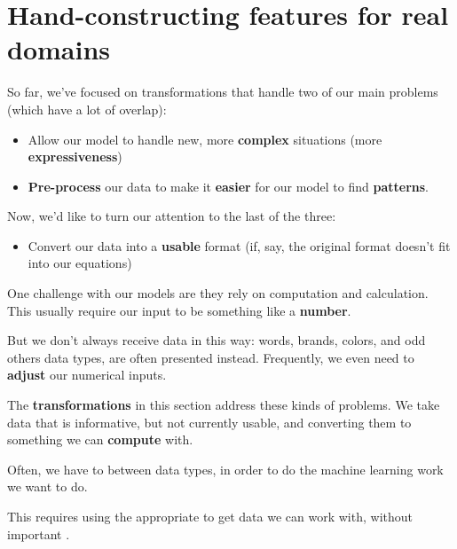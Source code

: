             
    \secdiv
    


            
    \pagebreak
    \section{Hand-constructing features for real domains }

        So far, we've focused on transformations that handle two of our main problems (which have a lot of overlap):

        \begin{itemize}
                \item Allow our model to handle new, more \textbf{complex} situations (more \textbf{expressiveness})

                \item \textbf{Pre-process} our data to make it \textbf{easier} for our model to find \textbf{patterns}.
                
            \end{itemize}

        Now, we'd like to turn our attention to the last of the three:

        \begin{itemize}
            \item Convert our data into a \textbf{usable} format (if, say, the original format doesn't fit into our equations)
        \end{itemize}

        One challenge with our models are they rely on computation and calculation. This usually require our input to be something like a \textbf{number}.

        But we don't always receive data in this way: words, brands, colors, and odd others data types, are often presented instead. Frequently, we even need to \textbf{adjust} our numerical inputs.

        The \textbf{transformations} in this section address these kinds of problems. We take data that is informative, but not currently usable, and converting them to something we can \textbf{compute} with.\\

        \begin{concept}
            Often, we have to  between data types, in order to do the machine learning work we want to do.

            This requires using the appropriate  to get data we can work with, without  important .
        \end{concept}


